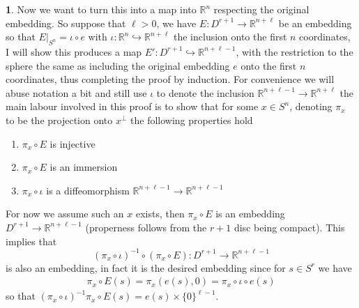 \documentclass[10.5pt]{article}
\theoremstyle{definition}
\newtheorem{pb}{}
\newcommand{\set}[1]{\{#1\}}
\begin{document}
\begin{pb}
        Now we want to turn this into a map into \(\mathbb{R}^n\) respecting the original embedding. So suppose that \(\ell > 0\), we have \(E: D^{r+1} \to \mathbb{R}^{n + \ell}\) be an embedding so that \(E\vert_{S^n} = \iota \circ e\) with \(\iota: \mathbb{R}^n \hookrightarrow \mathbb{R}^{n+\ell}\) the inclusion onto the first \(n\) coordinates, I will show this produces a map \(E': D^{r+1} \hookrightarrow \mathbb{R}^{n + \ell - 1}\), with the restriction to the sphere the same as including the original embedding \(e\) onto the first \(n\) coordinates, thus completing the proof by induction. For convenience we will abuse notation a bit and still use \(\iota\) to denote the inclusion \(\mathbb{R}^{n+\ell - 1} \to \mathbb{R}^{n + \ell}\) the main labour involved in this proof is to show that for some \(x \in S^n\), denoting \(\pi_x\) to be the projection onto \(x^\perp\) the following properties hold
        \begin{enumerate}
            \item \(\pi_x \circ E\) is injective
            \item \(\pi_x \circ E\) is an immersion
            \item \(\pi_x \circ \iota\) is a diffeomorphism \(\mathbb{R}^{n+\ell - 1} \to \mathbb{R}^{n + \ell - 1}\)
        \end{enumerate}
        For now we assume such an \(x\) exists, then \(\pi_x \circ E\) is an embedding \(D^{r+1} \to \mathbb{R}^{n + \ell - 1}\) (properness follows from the \(r+1\) disc being compact). This implies that \[(\pi_x \circ \iota)^{-1}\circ(\pi_x\circ E): D^{r+1} \to \mathbb{R}^{n + \ell - 1}\] is also an embedding, in fact it is the desired embedding since for \(s \in S^r\) we have
        \begin{align*}
            \pi_x\circ E(s) = \pi_x(e(s),0) = \pi_x\circ\iota\circ e(s)
        \end{align*}
        so that \((\pi_x\circ \iota)^{-1}\pi_x\circ E(s) = e(s) \times \set{0}^{\ell - 1}\).


\end{pb}
\end{document}
